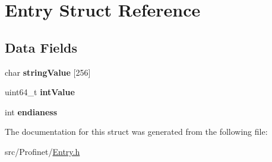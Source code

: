 \hypertarget{struct_entry}{\section{Entry Struct Reference}
\label{struct_entry}
}
\subsection*{Data Fields}
\begin{DoxyCompactItemize}
\item 
\hypertarget{struct_entry_a03752152ded02d0d09ff77a39ffeaa5e}{char {\bfseries string\-Value} \mbox{[}256\mbox{]}}\label{struct_entry_a03752152ded02d0d09ff77a39ffeaa5e}

\item 
\hypertarget{struct_entry_a474206387b836adeaf2e2ea8f3398acf}{uint64\-\_\-t {\bfseries int\-Value}}\label{struct_entry_a474206387b836adeaf2e2ea8f3398acf}

\item 
\hypertarget{struct_entry_a7505a50b1d42e3d4e766729b24d4cfb5}{int {\bfseries endianess}}\label{struct_entry_a7505a50b1d42e3d4e766729b24d4cfb5}

\end{DoxyCompactItemize}


The documentation for this struct was generated from the following file\-:\begin{DoxyCompactItemize}
\item 
src/\-Profinet/\hyperlink{_entry_8h}{Entry.\-h}\end{DoxyCompactItemize}
